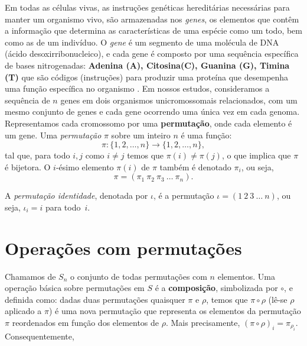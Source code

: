 \textcolor{red}{
}
Em todas as células vivas, as instruções genéticas hereditárias necessárias para manter um organismo vivo, são armazenadas nos \textit{genes}, os elementos que contêm a informação
que determina as características de uma espécie como um todo, bem como as de um indivíduo. O \textit{gene} é um segmento de uma molécula de DNA (ácido desoxirribonucleico), e cada gene é composto por uma sequência específica de bases nitrogenadas: \textbf{Adenina (A), Citosina(C), Guanina (G), Timina (T)}  que são códigos (instruções) para produzir uma proteína que desempenha uma função específica no organismo \cite{brucealbert}. Em nossos estudos, consideramos a sequência de $n$ genes em dois organismos unicromossomais relacionados, com um mesmo conjunto de genes e cada gene ocorrendo uma única vez em cada genoma. Representamos cada cromossomo por uma \textbf{permutação}, onde cada elemento é um gene. Uma \textit{permutação} $\pi$ sobre um inteiro $n$ é uma função:
\[\pi : \{1,2,\ldots,n\} \rightarrow \{1,2,\ldots,n\}, \]
tal que, para todo $i, j$ como $i \neq j$ temos que $\pi(i) \neq \pi (j)$, o que implica que $\pi$ é bijetora. O $i$-ésimo elemento $\pi(i)$ de $\pi$ também é denotado $\pi_i$, ou seja,
\[\pi = ( \pi_1 \ \pi_2 \ \pi_3 \ \ldots \ \pi_n).\]

A \textit{permutação identidade}, denotada por $\iota$, é a permutação $\iota = (1 \ 2 \ 3 \ \ldots \ n)$, ou seja, $\iota_i = i$ para todo~$i$.


\section{Operações com permutações}

Chamamos de $S_n$ o conjunto de todas permutações com $n$ elementos. Uma operação básica sobre permutações em $S$ é a \textbf{composição}, simbolizada por $\circ$, e definida como: dadas duas permutações quaisquer $\pi$ e  $\rho$, temos que $\pi \circ \rho$ (lê-se $\rho$ aplicado a $\pi$) é uma nova permutação que representa os elementos da permutação $\pi$ reordenados em função dos elementos de $\rho$. Mais precisamente, $(\pi \circ \rho)_i = \pi_{\rho_i}$. Consequentemente,

